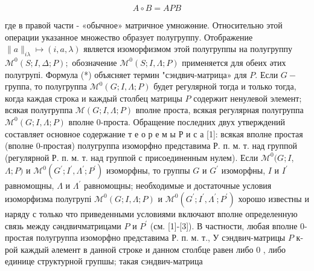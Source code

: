 \documentclass[10pt]{article}
\begin{document}
\[

A \circ B=A P B

\]



где в правой части - «обычное» матричное умножөние. Относительно этой операции указанное множество образует полугруппу. Отображение $\|a\|_{i \lambda} \mapsto(i, a, \lambda)$ является изоморфизмом этой полугруппы на полугруппу $\mathscr{M}^{0}(S ; I, \Delta ; P) ;$ обозначение $\mathscr{M}^{0}(S ; I, \Lambda ; P)$ применяется для обеих әтих полугрупі. Формула (*) объясняет термин "сэндвич-матрица» для $P$. Если $G-$ группа, то полугруппа $\mathscr{M}^{0}(G ; I, \Lambda ; P)$ будет регулярной тогда и только тогда, когда каждая строка и каждый столбец матрицы $P$ содержит ненулевой элемент; всякая полугруппа $\mathscr{M}(G ; I, \Lambda ; P)$ вполне проста, всякая регулярная полугруппа $\mathscr{M}^{0}(G ; I, \Lambda ; P)$ вполне 0-проста. Обращение последних двух утверждений составляет основное содержание т е о р е м ы Р и с а [1]: всякая вполне простая (вполне 0-простая) полугруппа изоморфно представима Р. п. м. т. над группой (регулярной Р. п. м. т. над группой с присоединенным нулем). Если $\mathscr{M}^{0}(G ; I$, $\Lambda ; P)$ и $\mathscr{M}^{0}\left(G^{\prime} ; I^{\prime}, \Lambda^{\prime} ; P^{\prime}\right)$ изоморфны, то группы $G$ и $G^{\prime}$ изоморфны, $I$ и $I^{\prime}$ равномощны, $\Lambda$ и $\Lambda^{\prime}$ равномощны; необходимые и достаточные условия изоморфизма полугрупі $\mathscr{M}^{0}(G ; I, \Lambda ; P)$ и $\mathscr{M}^{0}\left(G^{\prime} ; I^{\prime}, \Lambda^{\prime} ; P^{\prime}\right)$ хорошо известны и наряду с только что приведенными условиями включают вполне определенную связь между сәндвичматрицами $P$ и $P^{\prime}$ (см. [1]-[3]). В частности, любая вполне 0-простая полугруппа изоморфно представима Р. п. м. т., У сэндвич-матрицы $P$ к-рой каждый әлемент в данной строке и данном столбце равен либо 0 , либо единице структурной групшы; такая сэндвич-матрица
\end{document}
